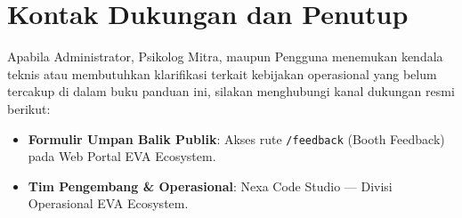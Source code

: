 \section{Kontak Dukungan dan Penutup}
Apabila Administrator, Psikolog Mitra, maupun Pengguna menemukan kendala teknis atau membutuhkan klarifikasi terkait kebijakan operasional yang belum tercakup di dalam buku panduan ini, silakan menghubungi kanal dukungan resmi berikut:
\begin{itemize}[leftmargin=1.4em]
  \item \textbf{Formulir Umpan Balik Publik}: Akses rute \texttt{/feedback} (Booth Feedback) pada Web Portal EVA Ecosystem.
  \item \textbf{Tim Pengembang \& Operasional}: Nexa Code Studio — Divisi Operasional EVA Ecosystem.
\end{itemize}

